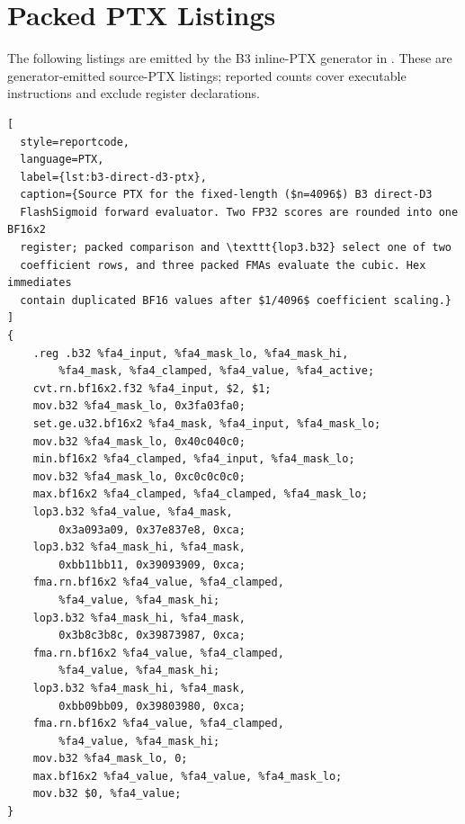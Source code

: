 \documentclass[11pt]{article}
\begin{document}
\clearpage
\section{Packed PTX Listings}
\label{app:packed-ptx}

The following listings are emitted by the B3 inline-PTX generator in
. These are
generator-emitted source-PTX listings; reported counts cover executable
instructions and exclude register declarations.

\begin{lstlisting}[
  style=reportcode,
  language=PTX,
  label={lst:b3-direct-d3-ptx},
  caption={Source PTX for the fixed-length ($n=4096$) B3 direct-D3
  FlashSigmoid forward evaluator. Two FP32 scores are rounded into one BF16x2
  register; packed comparison and \texttt{lop3.b32} select one of two
  coefficient rows, and three packed FMAs evaluate the cubic. Hex immediates
  contain duplicated BF16 values after $1/4096$ coefficient scaling.}
]
{
    .reg .b32 %fa4_input, %fa4_mask_lo, %fa4_mask_hi,
        %fa4_mask, %fa4_clamped, %fa4_value, %fa4_active;
    cvt.rn.bf16x2.f32 %fa4_input, $2, $1;
    mov.b32 %fa4_mask_lo, 0x3fa03fa0;
    set.ge.u32.bf16x2 %fa4_mask, %fa4_input, %fa4_mask_lo;
    mov.b32 %fa4_mask_lo, 0x40c040c0;
    min.bf16x2 %fa4_clamped, %fa4_input, %fa4_mask_lo;
    mov.b32 %fa4_mask_lo, 0xc0c0c0c0;
    max.bf16x2 %fa4_clamped, %fa4_clamped, %fa4_mask_lo;
    lop3.b32 %fa4_value, %fa4_mask,
        0x3a093a09, 0x37e837e8, 0xca;
    lop3.b32 %fa4_mask_hi, %fa4_mask,
        0xbb11bb11, 0x39093909, 0xca;
    fma.rn.bf16x2 %fa4_value, %fa4_clamped,
        %fa4_value, %fa4_mask_hi;
    lop3.b32 %fa4_mask_hi, %fa4_mask,
        0x3b8c3b8c, 0x39873987, 0xca;
    fma.rn.bf16x2 %fa4_value, %fa4_clamped,
        %fa4_value, %fa4_mask_hi;
    lop3.b32 %fa4_mask_hi, %fa4_mask,
        0xbb09bb09, 0x39803980, 0xca;
    fma.rn.bf16x2 %fa4_value, %fa4_clamped,
        %fa4_value, %fa4_mask_hi;
    mov.b32 %fa4_mask_lo, 0;
    max.bf16x2 %fa4_value, %fa4_value, %fa4_mask_lo;
    mov.b32 $0, %fa4_value;
}
\end{lstlisting}
\end{document}
